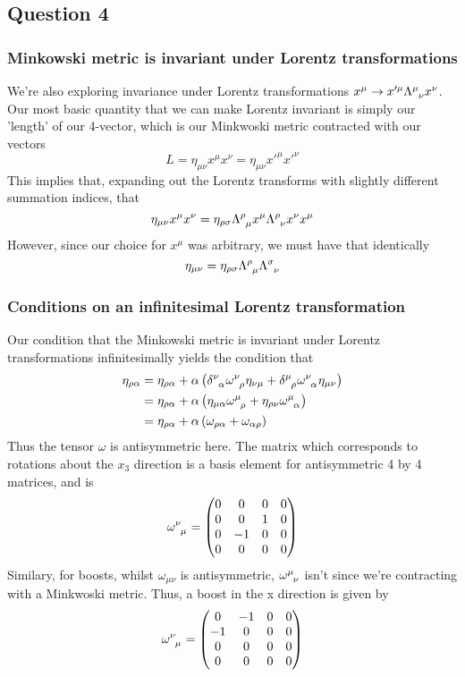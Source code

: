 \subsection{Question 4} 


\subsubsection*{Minkowski metric is invariant under Lorentz transformations} 
We're also exploring invariance under Lorentz transformations $x^\mu \rightarrow x'^\mu \Lambda\indices{^\mu_\nu}x^\nu$. Our most basic quantity that we can make Lorentz invariant is simply our 'length' of our 4-vector, which is our Minkwoski metric contracted with our vectors 
\[ 
L = \eta_{ \mu \nu} x^\mu x^\nu = \eta_{\mu \nu} x'^\mu x'^\nu 
\]
This implies that, expanding out the Lorentz transforms with slightly different summation indices, that 
\[ 
\eta_{ \mu \nu} x^\mu x^\nu  = \eta_{\rho \sigma} \Lambda \indices{^\rho_\mu} x^\mu \Lambda\indices{^\rho_\nu}x^\nu x^\mu  \] 
However, since our choice for $x^\mu$ was arbitrary, we must have that identically 
\[ 
\eta_{ \mu \nu}  = \eta_{\rho \sigma} \Lambda\indices{^\rho_\mu} \Lambda\indices{^\sigma_\nu} 
\]  

\subsubsection*{Conditions on an infinitesimal Lorentz transformation} 
Our condition that the Minkowski metric is invariant under Lorentz transformations infinitesimally yields the condition that 
\begin{align*}
\eta _{\rho \alpha} & = \eta_{\rho \alpha} + \alpha \left( \delta\indices{^\nu_\alpha} \omega\indices{^\nu_\rho} \eta_{\nu \mu}  + \delta\indices{^\mu_\rho} \omega\indices{^\nu_\alpha} \eta_{\mu \nu}\right)  \\
&= \eta_{\rho\alpha} + \alpha \left( \eta_{\mu \alpha} \omega\indices{^\mu_\rho} + \eta_{\rho\nu}\omega\indices{^\mu _\alpha}  \right) \\
&= \eta_{\rho\alpha}  + \alpha\left(  \omega_{\rho \alpha} + \omega_{\alpha \rho} \right) 
\end{align*}
Thus the tensor $\omega$ is antisymmetric here. The matrix which corresponds to rotations about the $x_3 $ direction is a basis element for antisymmetric 4 by 4 matrices, and is 
\[ 
\omega\indices{^\nu_\mu} = \begin{pmatrix} 0 & 0 & 0 & 0 \\
0 & 0 & 1 & 0 \\
0 & - 1 & 0 & 0 \\
0 & 0 & 0 & 0 
\end{pmatrix} 
\] 
Similary, for boosts, whilst $\omega_{ \mu \nu } $ is antisymmetric, $\omega\indices{^\mu_\nu} $ isn't since we're contracting with a Minkwoski metric. Thus, a boost in the x direction is given by 
\[ 
\omega\indices{^\nu_\mu} = \begin{pmatrix} 0 & -1 & 0 & 0 \\
			-1 & 0 & 0 & 0 \\
			0 & 0 & 0 & 0 \\
			0 & 0 & 0 & 0 
\end{pmatrix} 
\] 


\pagebreak  
